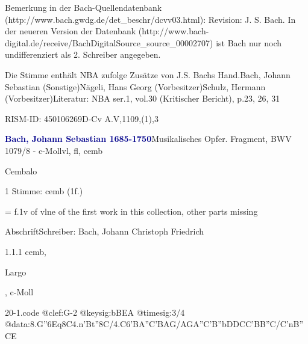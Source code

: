 \documentclass[a4paper, twocolumn, 11pt]{book}
\begin{document}
\newline %
\par Bemerkung in der Bach-Quellendatenbank (http://www.bach.gwdg.de/det\_beschr/dcvv03.html): {\textquotedbl}Revision: J. S. Bach{\textquotedbl}. In der neueren Version der Datenbank (http://www.bach-digital.de/receive/BachDigitalSource\_source\_00002707) ist Bach nur noch undifferenziert als 2. Schreiber angegeben.
\par Die Stimme enthält NBA zufolge Zusätze von J.S. Bachs Hand.\newline Bach, Johann Sebastian  (Sonstige)\newline Nägeli, Hans Georg  (Vorbesitzer)\newline Schulz, Hermann  (Vorbesitzer)\newline Literatur: NBA  ser.1, vol.30 (Kritischer Bericht), p.23, 26, 31
\par RISM-ID: 450106269\newline D-Cv  A.V,1109,(1),3
\par \vspace{16pt} \textcolor{darkblue}{\textbf{Bach, Johann Sebastian  1685-1750}}\hfillplus{[20]}\newline Musikalisches Opfer. Fragment, BWV 1079/8 - c-Moll\newline vl, fl, cemb
\par \begin{itshape} Cembalo\end{itshape} 
\par \textcolor{darkblue}{}  1 Stimme: cemb  (1f.)\newline \begin{small} = f.1v of vlne of the first work in this collection, other parts missing\end{small} \newline Abschrift\newline Schreiber: Bach, Johann Christoph Friedrich
\par 1.1.1  cemb, \begin{itshape}Largo\end{itshape}, c-Moll  
\begin{filecontents*}{20-1.code}
@clef:G-2
@keysig:bBEA
@timesig:3/4
@data:{8.G''6E}q8C4.n'Bt''8C/4.C6{'BA}{''C'BAG}/{AGA''C}{'B''bDDC}{C'BB''C}/{C'nB''CE}
\end{filecontents*}
\end{document}

